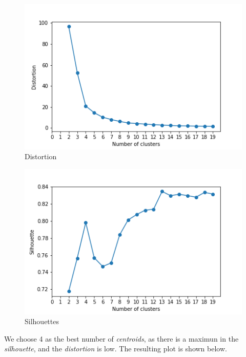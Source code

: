 \documentclass[idxtotoc,hyperref,openany]{labbook} %
\begin{document}
\begin{figure}[h]
\includegraphics[width=0.9\linewidth]{2710/KMeans_Distortion_Gyroscope.png}
\setlength\belowcaptionskip{-10pt}
\caption{Distortion}
\label{Distortion Gyroscope}
\end{figure}  

\begin{figure}[h]
\includegraphics[width=0.9\linewidth]{2710/KMeans_Silhouttes_Gyroscope.png}
\setlength\belowcaptionskip{-10pt}
\caption{Silhouettes}
\label{Silhouettes Gyroscope}
\end{figure}  

\clearpage

We choose 4 as the best number of \textit{centroids}, as there is a maximun in the \textit{silhouette}, and the \textit{distortion} is low. The resulting plot is shown below.
\end{document}
